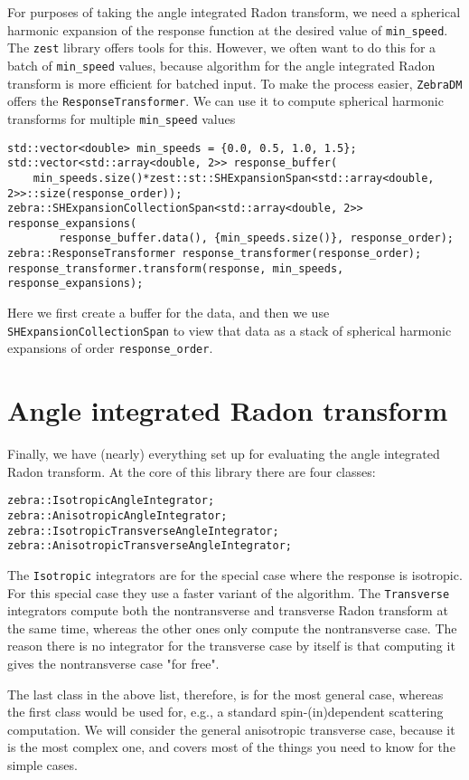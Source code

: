 \documentclass{article}
\begin{document}
For purposes of taking the angle integrated Radon transform, we need a spherical harmonic expansion of the response function at the desired value of \texttt{min_speed}. The \texttt{zest} library offers tools for this. However, we often want to do this for a batch of \texttt{min_speed} values, because algorithm for the angle integrated Radon transform is more efficient for batched input. To make the process easier, \texttt{ZebraDM} offers the \texttt{ResponseTransformer}. We can use it to compute spherical harmonic transforms for multiple \texttt{min_speed} values
\begin{verbatim}
std::vector<double> min_speeds = {0.0, 0.5, 1.0, 1.5};
std::vector<std::array<double, 2>> response_buffer(
    min_speeds.size()*zest::st::SHExpansionSpan<std::array<double, 2>>::size(response_order));
zebra::SHExpansionCollectionSpan<std::array<double, 2>>
response_expansions(
        response_buffer.data(), {min_speeds.size()}, response_order);
zebra::ResponseTransformer response_transformer(response_order);
response_transformer.transform(response, min_speeds, response_expansions);
\end{verbatim}
Here we first create a buffer for the data, and then we use \texttt{SHExpansionCollectionSpan} to view that data as a stack of spherical harmonic expansions of order \texttt{response_order}.

\section{Angle integrated Radon transform}

Finally, we have (nearly) everything set up for evaluating the angle integrated Radon transform. At the core of this library there are four classes:
\begin{verbatim}
zebra::IsotropicAngleIntegrator;
zebra::AnisotropicAngleIntegrator;
zebra::IsotropicTransverseAngleIntegrator;
zebra::AnisotropicTransverseAngleIntegrator;
\end{verbatim}
The \texttt{Isotropic} integrators are for the special case where the response is isotropic. For this special case they use a faster variant of the algorithm. 
The \texttt{Transverse} integrators compute both the nontransverse and transverse Radon transform at the same time, whereas the other ones only compute the nontransverse case. The reason there is no integrator for the transverse case by itself is that computing it gives the nontransverse case "for free". 

The last class in the above list, therefore, is for the most general case, whereas the first class would be used for, e.g., a standard spin-(in)dependent scattering computation. We will consider the general anisotropic transverse case, because it is the most complex one, and covers most of the things you need to know for the simple cases.
\end{document}
